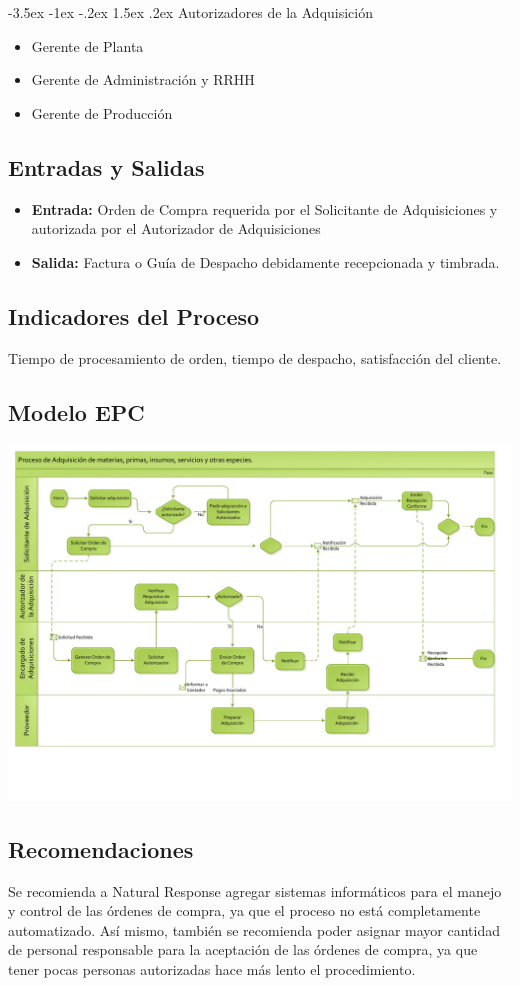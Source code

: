 \documentclass[12pt,letterpaper]{article}
\makeatletter
\newcommand\subsubsubsection{\@startsection {paragraph}{1}{\z@}%
                                   {-3.5ex \@plus -1ex \@minus -.2ex}%
                                   {1.5ex \@plus.2ex}%
                                   {\normalfont\bfseries}}
\makeatother
\begin{document}
\subsubsubsection{Autorizadores de la Adquisición}
\begin{itemize}
\item Gerente de Planta
\item Gerente de Administración y RRHH
\item Gerente de Producción
\end{itemize}

\subsection{Entradas y Salidas}
\begin{itemize}
\item \textbf{Entrada:} Orden de Compra requerida por el Solicitante de Adquisiciones y autorizada por el Autorizador de Adquisiciones
\item \textbf{Salida:} Factura o Guía de Despacho debidamente recepcionada y timbrada.
\end{itemize}

\subsection{Indicadores del Proceso}
Tiempo de procesamiento de orden, tiempo de despacho, satisfacción del cliente.

\subsection{Modelo EPC}
\includegraphics[angle=90,page=1,height=\textheight - 40px]{adquisicion.pdf}

\subsection{Recomendaciones}
Se recomienda a Natural Response agregar sistemas informáticos para el manejo y control de las órdenes de compra, ya que el proceso no está completamente automatizado. Así mismo, también se recomienda poder asignar mayor cantidad de personal responsable para la aceptación de las órdenes de compra, ya que tener pocas personas autorizadas hace más lento el procedimiento.
\end{document}
